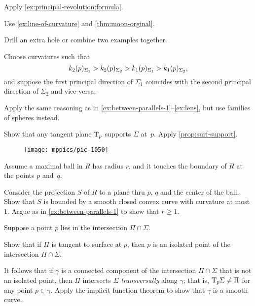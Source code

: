 \begin{multicols}{2}
 Apply \ref{ex:principal-revolution:formula}.

Use \ref{ex:line-of-curvature} and \ref{thm:moon-orginal}.

 Drill an extra hole or combine two examples together.



\setcounter{eqtn}{0}

Choose curvatures such that 
\[k_2(p)_{\Sigma_1}\z>k_2(p)_{\Sigma_2}> k_1(p)_{\Sigma_1}> k_1(p)_{\Sigma_2},\]
and suppose the first principal direction of $\Sigma_1$ coincides with the second principal direction of $\Sigma_2$ and vice-versa.

Apply the same reasoning as in \ref{ex:between-parallels-1}--\ref{ex:lens}, but use families of spheres instead.

Show that any tangent plane $\mathrm{T}_p$ supports $\Sigma$ at~$p$.
Apply \ref{prop:surf-support}.

{

\begin{wrapfigure}{r}{16 mm}
\vskip-0mm
\centering
\texttt{[image: mppics/pic-1050]}
\vskip-0mm
\end{wrapfigure}

Assume a maximal ball in $R$ has radius $r$, and it touches the boundary of $R$ at the points $p$ and~$q$.

Consider the projection $S$ of $R$ to a plane thru $p$, $q$ and the center of the ball.
Show that $S$ is bounded by a smooth closed convex curve with curvature at most $1$.
Argue as in \ref{ex:between-parallels-1} to
show that $r\ge 1$.

}

Suppose a point $p$ lies in the intersection $\Pi\cap\Sigma$.

Show that if $\Pi$ is tangent to surface at $p$,
then $p$ is an isolated point of the intersection $\Pi\cap\Sigma$.

It follows that if $\gamma$ is a connected component of the intersection $\Pi\cap\Sigma$ that is not an isolated point,
then $\Pi$ intersects $\Sigma$ \emph{transversally} along $\gamma$;
that is, $\mathrm{T}_p\Sigma\ne\Pi$ for any point $p \in \gamma$.
Apply the implicit function theorem to show that $\gamma$ is a smooth curve.


\end{multicols}
